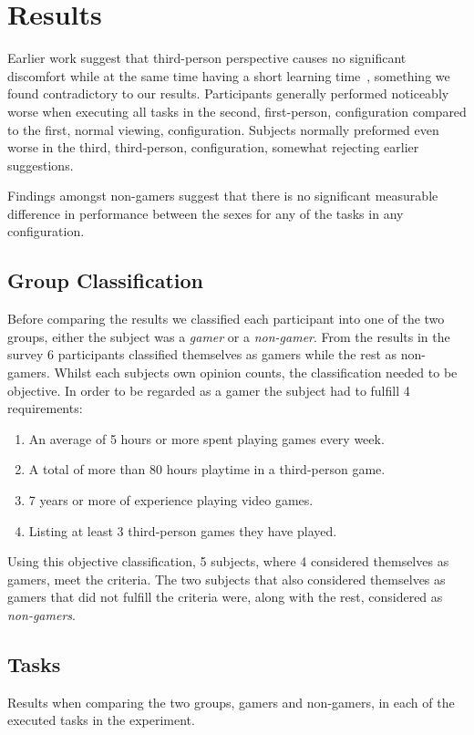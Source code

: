 \documentclass[runningheads,a4paper,oribibl]{llncs}
\begin{document}
\section{Results}
Earlier work suggest that third-person perspective causes no significant discomfort while at the same time having a short learning time~\cite{nakamura20103pi}, something we found contradictory to our results. Participants generally performed noticeably worse when executing all tasks in the second, first-person, configuration compared to the first, normal viewing, configuration. Subjects normally preformed even worse in the third, third-person, configuration, somewhat rejecting earlier suggestions. 

Findings amongst non-gamers suggest that there is no significant measurable difference in performance between the sexes for any of the tasks in any configuration.





\subsection{Group Classification}
Before comparing the results we classified each participant into one of the two groups, either the subject was a \emph{gamer} or a \emph{non-gamer}. From the results in the survey 6 participants classified themselves as gamers while the rest as non-gamers. Whilst each subjects own opinion counts, the classification needed to be objective. In order to be regarded as a gamer the subject had to fulfill 4 requirements:
\begin{enumerate}
	\item An average of 5 hours or more spent playing games every week. 
	\item A total of more than 80 hours playtime in a third-person game.
	\item 7 years or more of experience playing video games.
	\item Listing at least 3 third-person games they have played.
\end{enumerate}
Using this objective classification, 5 subjects, where 4 considered themselves as gamers, meet the criteria. The two subjects that also considered themselves as gamers that did not fulfill the criteria were, along with the rest, considered as \emph{non-gamers}.





\subsection{Tasks}
Results when comparing the two groups, gamers and non-gamers, in each of the executed tasks in the experiment.
\end{document}

